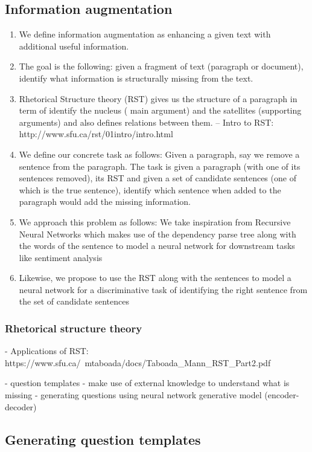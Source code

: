 \documentclass[11pt]{article}
\begin{document}
\subsection{Information augmentation}
\begin{enumerate}
\item We define information augmentation as enhancing a given text with additional useful information. 
\item The goal is the following: given a fragment of text (paragraph or document), identify what information is structurally missing from the text. 
\item Rhetorical Structure theory (RST) gives us the structure of a paragraph in term of identify the nucleus ( main argument) and the satellites (supporting arguments) and also defines relations between them. -- Intro to RST: http://www.sfu.ca/rst/01intro/intro.html
\item We define our concrete task as follows: Given a paragraph, say we remove a sentence from the paragraph. The task is given a paragraph (with one of its sentences removed), its RST and given a set of candidate sentences (one of which is the true sentence), identify which sentence when added to the paragraph would add the missing information.
\item We approach this problem as follows: We take inspiration from Recursive Neural Networks which makes use of the dependency parse tree along with the words of the sentence to model a neural network for downstream tasks like sentiment analysis
\item Likewise, we propose to use the RST along with the sentences to model a neural network for a discriminative task of identifying the right sentence from the set of candidate sentences
\end{enumerate}

\subsubsection{Rhetorical structure theory}

- Applications of RST: https://www.sfu.ca/~mtaboada/docs/Taboada_Mann_RST_Part2.pdf

\iffalse
- question templates
- make use of external knowledge to understand what is missing
- generating questions using neural network generative model (encoder-decoder)

\subsection{Generating question templates}
\end{document}
